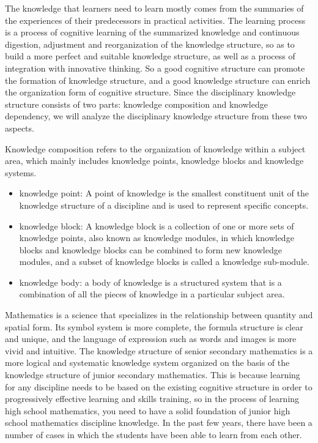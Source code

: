 The knowledge that learners need to learn mostly comes from the summaries of the experiences of their predecessors in practical activities. The learning process is a process of cognitive learning of the summarized knowledge and continuous digestion, adjustment and reorganization of the knowledge structure, so as to build a more perfect and suitable knowledge structure, as well as a process of integration with innovative thinking. So a good cognitive structure can promote the formation of knowledge structure, and a good knowledge structure can enrich the organization form of cognitive structure. Since the disciplinary knowledge structure consists of two parts: knowledge composition and knowledge dependency, we will analyze the disciplinary knowledge structure from these two aspects.

Knowledge composition refers to the organization of knowledge within a subject area, which mainly includes knowledge points, knowledge blocks and knowledge systems. 
\begin{itemize}
	\item knowledge point: A point of knowledge is the smallest constituent unit of the knowledge structure of a discipline and is used to represent specific concepts. 
	\item knowledge block: A knowledge block is a collection of one or more sets of knowledge points, also known as knowledge modules, in which knowledge blocks and knowledge blocks can be combined to form new knowledge modules, and a subset of knowledge blocks is called a knowledge sub-module.
	\item knowledge body: a body of knowledge is a structured system that is a combination of all the pieces of knowledge in a particular subject area.
\end{itemize}


Mathematics is a science that specializes in the relationship between quantity and spatial form. Its symbol system is more complete, the formula structure is clear and unique, and the language of expression such as words and images is more vivid and intuitive. The knowledge structure of senior secondary mathematics is a more logical and systematic knowledge system organized on the basis of the knowledge structure of junior secondary mathematics. This is because learning for any discipline needs to be based on the existing cognitive structure in order to progressively effective learning and skills training, so in the process of learning high school mathematics, you need to have a solid foundation of junior high school mathematics discipline knowledge. In the past few years, there have been a number of cases in which the students have been able to learn from each other.

